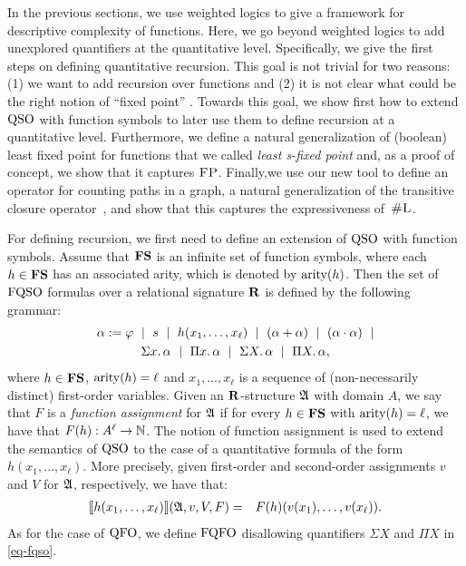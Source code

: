 
In the previous sections, we use weighted logics to give a framework for descriptive complexity of functions. Here, we go beyond weighted logics to add unexplored quantifiers at the quantitative level. Specifically, we give the first steps on defining quantitative recursion. This goal is not trivial for two reasons: (1) we want to add recursion over functions and (2) it is not clear what could be the right notion of ``fixed point'' . 
Towards this goal, we show first how to extend ${\rm QSO}$ with function symbols to later use them to define recursion at a quantitative level. 
Furthermore, we define a natural generalization of (boolean) least fixed point for functions that we called \emph{least s-fixed point} and, as a proof of concept, we show that it captures $\text{\sc FP}$.
Finally,we use our new tool to define an operator for counting paths in a graph, a natural generalization of the transitive closure operator~\cite{immerman1999descriptive}, and show that this captures the expressiveness of~$\text{\sc \#L}$.

For defining recursion, we first need to define an extension of ${\rm QSO}$ with function symbols. Assume that $\mathbf{FS}$ is an infinite set of function symbols, where each $h \in \mathbf{FS}$ has an associated arity, which is denoted by ${\rm arity}(h)$. Then the set of ${\rm FQSO}$ formulas over a relational signature $\mathbf{R}$ is defined by the following grammar:
\begin{multline}
\label{eq-fqso}
	\alpha := \varphi \ \mid \  s \  \mid \  h(x_1, \ldots, x_\ell) \  \mid \
	(\alpha \add \alpha) \  \mid\  (\alpha \mult \alpha) \  \mid \\  
	\sa{x} \alpha \  \mid \
	\pa{x} \alpha \  \mid \
	\sa{X} \alpha \  \mid \
	\pa{X} \alpha,
\end{multline}
where $h \in \mathbf{FS}$, ${\rm arity}(h) = \ell$ and $x_1, \ldots, x_\ell$ is a sequence of (non-necessarily distinct) first-order variables. Given an $\mathbf{R}$-structure $\mathfrak{A}$ with domain $A$, we say that $F$ is a \emph{function assignment} for $\mathfrak{A}$ if for every $h \in \mathbf{FS}$ with ${\rm arity}(h) = \ell$, we have that $F(h) :  A^\ell \to \mathbb{N}$. The notion of function assignment is used to extend the semantics of ${\rm QSO}$ to the case of a quantitative formula of the form $h(x_1, \ldots, x_\ell)$. More precisely, given first-order and second-order assignments $v$ and $V$ for $\mathfrak{A}$, respectively, 
we have that:
\begin{eqnarray*}
{\llbracket{}{h(x_1, \ldots, x_\ell)}\rrbracket}(\mathfrak{A},v,V,F) & = & F(h)(v(x_1),\ldots, v(x_\ell)).
\end{eqnarray*}
As for the case of ${\rm QFO}$, we define ${\rm FQFO}$ disallowing quantifiers $\Sigma X$ and $\Pi X$ in \eqref{eq-fqso}.

